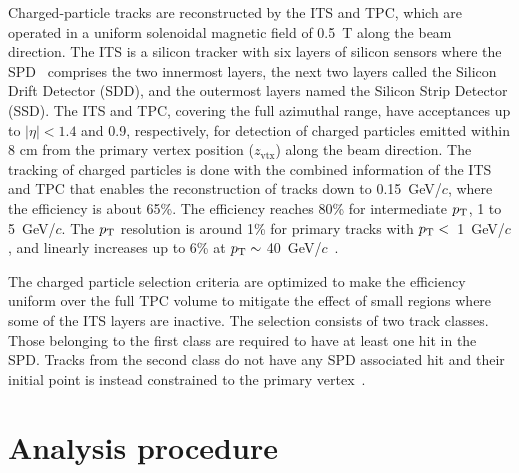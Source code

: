 Charged-particle tracks are reconstructed by the ITS and TPC, which are operated in a uniform solenoidal magnetic field of 0.5~T along the beam direction. The ITS is a silicon tracker with six layers of silicon sensors where the SPD~\cite{Santoro2009:ALICESPD} comprises the two innermost layers, the next two layers called the Silicon Drift Detector (SDD), and the outermost layers named the Silicon Strip Detector (SSD). The ITS and TPC, covering the full azimuthal range, have acceptances up to $|\eta| < 1.4$ and 0.9, respectively, for detection of charged particles emitted within 8 cm from the primary vertex position ($z_\mathrm{vtx}$) along the beam direction. The tracking of charged particles is done with the combined information of the ITS and TPC that enables the reconstruction of tracks down to 0.15~GeV/$c$, where the efficiency is about 65\%. The efficiency reaches 80\% for intermediate $p_\mathrm{T}$, 1 to 5~GeV/$c$. The $p_\mathrm{T}$ resolution is around 1\% for primary tracks with $p_\mathrm{T}<$~1~GeV/$c$, and linearly increases up to 6\% at $p_\mathrm{T} \sim$ 40~GeV/$c$~\cite{Contin_2012:ITSPTRES}.

The charged particle selection criteria are optimized to make the efficiency uniform over the full TPC volume to mitigate the effect of small regions where some of the ITS layers are inactive. The selection consists of two track classes. Those belonging to the first class are required to have at least one hit in the SPD. Tracks from the second class do not have any SPD associated hit and their initial point is instead constrained to the primary vertex~\cite{Adam:2015ewa}.

\section{Analysis procedure}
\label{sec:ana}
